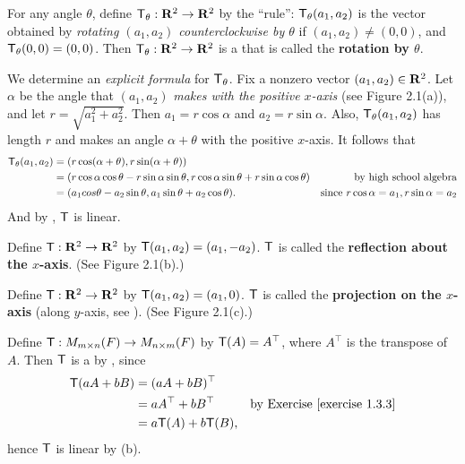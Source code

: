 \begin{example} \label{example 2.1.2}
For any angle \(\theta\), define \(\textsf{T}_{\theta} : \mathbf{R}^2 \to \mathbf{R}^2\) by the ``rule'':
\(\textsf{T}_{\theta} (a_1, a_2)\) is the vector obtained by \emph{rotating \((a_1, a_2)\) counterclockwise by \(\theta\)} if \((a_1, a_2) \ne (0, 0)\), and \(\textsf{T}_{\theta}(0, 0) = (0, 0)\).
Then \(\textsf{T}_{\theta} : \mathbf{R}^2 \to \mathbf{R}^2\) is a \LTRAN{} that is called the \textbf{rotation by \(\theta\)}.

We determine an \emph{explicit formula} for \(\textsf{T}_{\theta}\).
Fix a nonzero vector \((a_1, a_2) \in \mathbf{R}^2\).
Let \(\alpha\) be the angle that \((a_1, a_2)\) \emph{makes with the positive \(x\)-axis} (see Figure 2.1(a)),
and let \(r = \sqrt{a_1^2 + a_2^2}\).
Then \(a_1 = r \cos \alpha\) and \(a_2 = r \sin \alpha\).
Also, \(\textsf{T}_{\theta}(a_1, a_2)\) has length \(r\) and makes an angle \(\alpha + \theta\) with the positive \(x\)-axis.
It follows that
\begin{align*}
    \textsf{T}_{\theta}(a_1, a_2) & = (r \cos(\alpha + \theta), r \sin(\alpha + \theta)) \\
                         & = (r \cos \alpha \cos \theta - r \sin \alpha \sin \theta,  r \cos \alpha \sin \theta + r \sin \alpha \cos \theta) & \text{by high school algebra} \\
                         & = (a_1 cos \theta - a_2 \sin \theta, a_1 \sin \theta + a_2 \cos \theta). & \text{since \(r \cos \alpha = a_1, r \sin \alpha = a_2\)}
\end{align*}
And by , \(\textsf{T}\) is linear.
\end{example}

\begin{example} \label{example 2.1.3}
Define \(\textsf{T} : \mathbf{R}^2 \to \mathbf{R}^2\) by \(\textsf{T}(a_1, a_2) = (a_1, -a_2)\).
\(\textsf{T}\) is called the \textbf{reflection about the \(x\)-axis}.
(See Figure 2.1(b).)
\end{example}

\begin{example} \label{example 2.1.4}
Define \(\textsf{T} : \mathbf{R}^2 \to \mathbf{R}^2\) by \(\textsf{T}(a_1, a_2) = (a_1, 0)\).
\(\textsf{T}\) is called the \textbf{projection on the \(x\)-axis} (along \(y\)-axis, see ).
(See Figure 2.1(c).) 
\end{example}

\begin{example} \label{example 2.1.5}
Define \(\textsf{T} : M_{m \times n}(F) \to M_{n \times m}(F)\) by \(\textsf{T}(A) = A^\top\), where \(A^\top\) is the transpose of \(A\).
Then \(\textsf{T}\) is a \LTRAN{} by , since
\begin{align*}
    \T(aA + bB) & = (aA + bB)^\top \\
               & = aA^\top + bB^\top & \text{by \EXEC{1.3.3}} \\
               & = a\T(A) + b\T(B),
\end{align*}
hence \(\textsf{T}\) is linear by (b).
\end{example}

